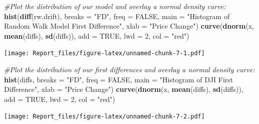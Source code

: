 \documentclass[]{article}
\newenvironment{Shaded}{\begin{snugshade}}{\end{snugshade}}
\newcommand{\CommentTok}[1]{\textcolor[rgb]{0.56,0.35,0.01}{\textit{#1}}}
\newcommand{\DataTypeTok}[1]{\textcolor[rgb]{0.13,0.29,0.53}{#1}}
\newcommand{\DecValTok}[1]{\textcolor[rgb]{0.00,0.00,0.81}{#1}}
\newcommand{\KeywordTok}[1]{\textcolor[rgb]{0.13,0.29,0.53}{\textbf{#1}}}
\newcommand{\NormalTok}[1]{#1}
\newcommand{\OperatorTok}[1]{\textcolor[rgb]{0.81,0.36,0.00}{\textbf{#1}}}
\newcommand{\OtherTok}[1]{\textcolor[rgb]{0.56,0.35,0.01}{#1}}
\newcommand{\StringTok}[1]{\textcolor[rgb]{0.31,0.60,0.02}{#1}}
\begin{document}
\begin{Shaded}
\begin{Highlighting}[]
\CommentTok{#Plot the distribution of our model and overlay a normal density curve:}
\KeywordTok{hist}\NormalTok{(}\KeywordTok{diff}\NormalTok{(rw.drift), }\DataTypeTok{breaks =} \StringTok{"FD"}\NormalTok{, }\DataTypeTok{freq =} \OtherTok{FALSE}\NormalTok{, }\DataTypeTok{main =} \StringTok{"Histogram of Random Walk Model First Difference"}\NormalTok{, }\DataTypeTok{xlab =} \StringTok{"Price Change"}\NormalTok{)}
\KeywordTok{curve}\NormalTok{(}\KeywordTok{dnorm}\NormalTok{(x, }\KeywordTok{mean}\NormalTok{(diffs), }\KeywordTok{sd}\NormalTok{(diffs)), }\DataTypeTok{add =} \OtherTok{TRUE}\NormalTok{, }\DataTypeTok{lwd =} \DecValTok{2}\NormalTok{, }\DataTypeTok{col =} \StringTok{"red"}\NormalTok{)}
\end{Highlighting}
\end{Shaded}

\texttt{[image: Report\_files/figure-latex/unnamed-chunk-7-1.pdf]}

\begin{Shaded}
\begin{Highlighting}[]
\CommentTok{#Plot the distribution of our first differences and overlay a normal density curve:}
\KeywordTok{hist}\NormalTok{(diffs, }\DataTypeTok{breaks =} \StringTok{"FD"}\NormalTok{, }\DataTypeTok{freq =} \OtherTok{FALSE}\NormalTok{, }\DataTypeTok{main =} \StringTok{"Histogram of DJI First Difference"}\NormalTok{, }\DataTypeTok{xlab =} \StringTok{"Price Change"}\NormalTok{)}
\KeywordTok{curve}\NormalTok{(}\KeywordTok{dnorm}\NormalTok{(x, }\KeywordTok{mean}\NormalTok{(diffs), }\KeywordTok{sd}\NormalTok{(diffs)), }\DataTypeTok{add =} \OtherTok{TRUE}\NormalTok{, }\DataTypeTok{lwd =} \DecValTok{2}\NormalTok{, }\DataTypeTok{col =} \StringTok{"red"}\NormalTok{)}
\end{Highlighting}
\end{Shaded}

\texttt{[image: Report\_files/figure-latex/unnamed-chunk-7-2.pdf]}

\begin{Shaded}
\end{Shaded}
\end{document}
